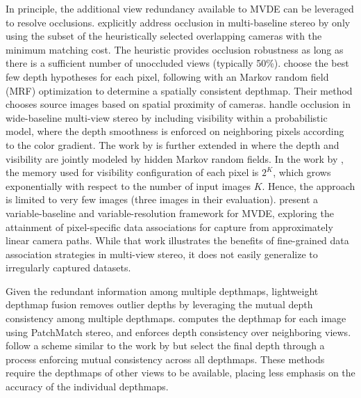 In principle, the additional view  redundancy available to MVDE can be leveraged to resolve occlusions. \citet{handle_occlusion2001} explicitly address occlusion in multi-baseline stereo by only using the subset of the heuristically selected overlapping cameras with the minimum matching cost. The heuristic provides occlusion robustness as long as there is a sufficient number of unoccluded views (typically 50\%). \citet{MultiHypothesis_ECCV2008} choose the best few depth hypotheses for each pixel, following with an Markov random field (MRF) optimization to determine a spatially consistent depthmap. Their method chooses source images based on spatial proximity of cameras. \citet{Strecha_BayesModelCVPR2004} handle occlusion in wide-baseline multi-view stereo by including visibility within a probabilistic model, where the depth smoothness is enforced on neighboring pixels according to the color gradient. The work by \citet{Strecha_BayesModelCVPR2004} is further extended in \citet{CombinedDepthOutlier} where the depth and visibility are jointly modeled by hidden Markov random fields. In the work by \citet{CombinedDepthOutlier}, the memory used for visibility configuration of each pixel is $2^K$, which grows exponentially with respect to the number of input images $K$. Hence, the approach is limited to very few images (three images in their evaluation). %
\citet{Gallup08} present a variable-baseline and variable-resolution framework for MVDE, exploring the attainment of pixel-specific data associations for capture from approximately linear camera paths. While that work illustrates the benefits of fine-grained data association strategies in multi-view stereo, it does not easily generalize to irregularly captured datasets. 

Given the redundant information among multiple depthmaps, lightweight depthmap fusion removes outlier depths by leveraging the mutual depth consistency among multiple depthmaps.  \citet{Shen_TIP2013} computes the depthmap for each image using PatchMatch \mbox{stereo}, and enforces depth consistency over neighboring views. \citet{LeastCommitment_3DIMPVT2012} follow a scheme similar to the work by \citet{MultiHypothesis_ECCV2008} but select the final depth through a process enforcing mutual consistency across all depthmaps. These methods require the depthmaps of other views to be available, placing less emphasis on the accuracy of the individual depthmaps.%

